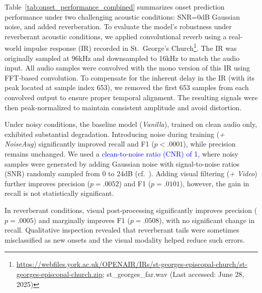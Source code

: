 \documentclass{article}
\newcommand{\alex}[1]{\textcolor{blue}{#1}}%
\begin{document}
Table~\ref{tab:onset_performance_combined} summarizes onset prediction performance under two challenging acoustic conditions: SNR=0\si{dB} Gaussian noise, and added reverberation. To evaluate the model's robustness under reverberant acoustic conditions, we applied convolutional reverb using a real-world impulse response (IR) recorded in St.~George's Church\footnote{\href{https://webfiles.york.ac.uk/OPENAIR/IRs/st-georges-episcopal-church/st-georges-episcopal-church.zip}{https://webfiles.york.ac.uk/OPENAIR/IRs/st-georges-episcopal-church/st-georges-episcopal-church.zip}; st\_georges\_far.wav (Last accessed: June 28, 2025)}. The IR was originally sampled at 96\si{kHz} and downsampled to 16\si{kHz} to match the audio input. All audio samples were convolved with the mono version of this IR using FFT-based convolution. To compensate for the inherent delay in the IR (with its peak located at sample index 653), we removed the first 653 samples from each convolved output to ensure proper temporal alignment. The resulting signals were then peak-normalized to maintain consistent amplitude and avoid distortion.

Under noisy conditions, the baseline model (\textit{Vanilla}), trained on clean audio only, exhibited substantial degradation. Introducing noise during training (\textit{+ NoiseAug}) significantly improved recall and F1 ($p < .0001$), while precision remains unchanged. We used a \alex{clean-to-noise ratio (CNR) of 1}, where noisy samples were generated by adding Gaussian noise with signal-to-noise ratios (SNR) randomly sampled from 0 to 24\si{dB} (cf.~\cite{ISMIR24Kim}). Adding visual filtering (\textit{+ Video}) further improves precision ($p = .0052$) and F1 ($p = .0101$), however, the gain in recall is not statistically significant.

In reverberant conditions, visual post-processing significantly improves precision ($p = .0005$) and marginally improves F1 ($p = .0508$), with no significant change in recall. Qualitative inspection revealed that reverberant tails were sometimes misclassified as new onsets and the visual modality helped reduce such errors.

 
\end{document}
